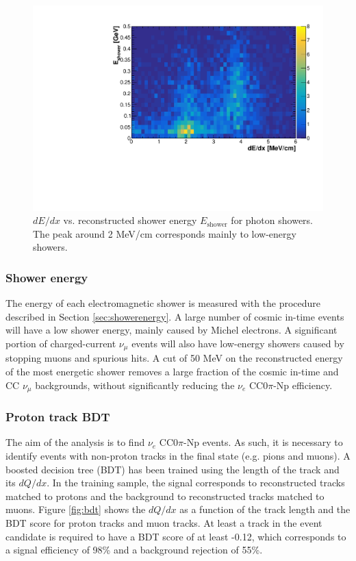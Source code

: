 \begin{figure}[htbp]
\centering
  \includegraphics[width=0.7\linewidth]{figures/dedx_energy.pdf}
  \caption{$dE/dx$ vs. reconstructed shower energy $E_{\mathrm{shower}}$ for photon showers. The peak around 2 MeV/cm corresponds mainly to low-energy showers.}\label{fig:dedx_energy}
\end{figure}


\subsubsection{Shower energy}
The energy of each electromagnetic shower is measured with the procedure described in Section \ref{sec:showerenergy}. A large number of cosmic in-time events will have a low shower energy, mainly caused by Michel electrons. A significant portion of charged-current $\nu_{\mu}$ events will also have low-energy showers caused by stopping muons and spurious hits. A cut of 50 MeV on the reconstructed energy of the most energetic shower removes a large fraction of the cosmic in-time and CC $\nu_{\mu}$ backgrounds, without significantly reducing the $\nu_{e}$ CC0$\pi$-Np efficiency. 


\subsubsection{Proton track BDT}\label{sec:protbdt}
The aim of the analysis is to find $\nu_{e}$ CC$0\pi$-Np events. As such, it is necessary to identify events with non-proton tracks in the final state (e.g. pions and muons). A boosted decision tree (BDT) has been trained using the length of the track and its $dQ/dx$. In the training sample, the signal corresponds to reconstructed tracks matched to protons and the background to reconstructed tracks matched to muons. Figure \ref{fig:bdt} shows the $dQ/dx$ as a function of the track length and the BDT score for proton tracks and muon tracks. At least a track in the event candidate is required to have a BDT score of at least -0.12, which corresponds to a signal efficiency of 98\% and a background rejection of 55\%. 

